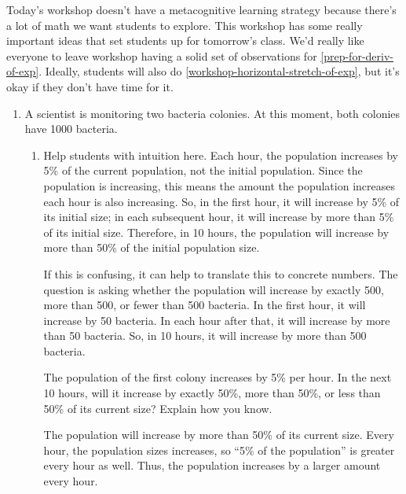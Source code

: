 \documentclass{article}
\begin{document}

\begin{workshop}
  Today's workshop doesn't have a metacognitive learning strategy because there's a lot of math we want students to explore. This workshop has some really important ideas that set students up for tomorrow's class. We'd really like everyone to leave workshop having a solid set of observations for \ref{prep-for-deriv-of-exp}. Ideally, students will also do \ref{workshop-horizontal-stretch-of-exp}, but it's okay if they don't have time for it.
\end{workshop}

\begin{enumerate}
\item  \label{workshop-exponential-vs-linear}

  A scientist is monitoring two bacteria colonies. At this moment, both colonies have 1000 bacteria.

  \begin{enumerate}
  \item

    \begin{workshop}
      Help students with intuition here. Each hour, the population increases by 5\% of the current population, not the initial population. Since the population is increasing, this means the amount the population increases each hour is also increasing. So, in the first hour, it will increase by 5\% of its initial size; in each subsequent hour, it will increase by more than 5\% of its initial size. Therefore, in 10 hours, the population will increase by more than 50\% of the initial population size.

      If this is confusing, it can help to translate this to concrete numbers. The question is asking whether the population will increase by exactly 500, more than 500, or fewer than 500 bacteria. In the first hour, it will increase by 50 bacteria. In each hour after that, it will increase by more than 50 bacteria. So, in 10 hours, it will increase by more than 500 bacteria. 
    \end{workshop}

    \begin{problem}[\vfill]
      The population of the first colony increases by 5\% per hour. In the next 10 hours, will it increase by exactly 50\%, more than 50\%, or less than 50\% of its current size? Explain how you know. 
    \end{problem}

    \begin{solution}
        The population will increase by more than 50\% of its current size. Every hour, the population sizes increases, so ``5\% of the population'' is greater every hour as well. Thus, the population increases by a larger amount every hour. 
    \end{solution}


\end{enumerate}
\end{enumerate}
\end{document}
